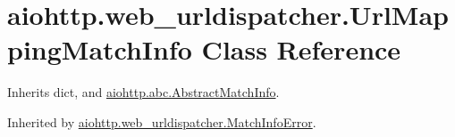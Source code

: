 \hypertarget{classaiohttp_1_1web__urldispatcher_1_1_url_mapping_match_info}{}\section{aiohttp.\+web\+\_\+urldispatcher.\+Url\+Mapping\+Match\+Info Class Reference}
\label{classaiohttp_1_1web__urldispatcher_1_1_url_mapping_match_info}


Inherits dict, and \hyperlink{classaiohttp_1_1abc_1_1_abstract_match_info}{aiohttp.\+abc.\+Abstract\+Match\+Info}.



Inherited by \hyperlink{classaiohttp_1_1web__urldispatcher_1_1_match_info_error}{aiohttp.\+web\+\_\+urldispatcher.\+Match\+Info\+Error}.

